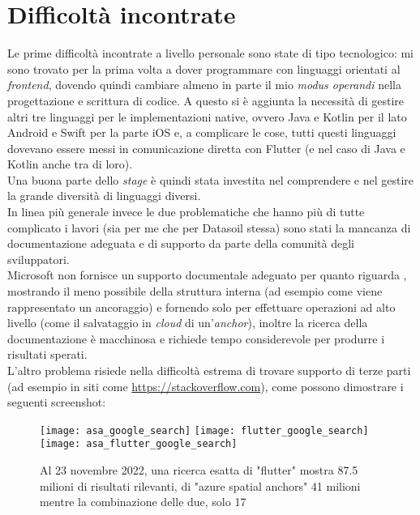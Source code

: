 \section{Difficoltà incontrate}
\label{sec:difficolta_incontrate}
Le prime difficoltà incontrate a livello personale sono state di tipo tecnologico: mi sono trovato per la prima volta a dover programmare con linguaggi orientati al \textit{frontend}, dovendo quindi cambiare almeno in parte il mio \textit{modus operandi} nella progettazione e scrittura di codice. A questo si è aggiunta la necessità di gestire altri tre linguaggi per le implementazioni native, ovvero Java e Kotlin per il lato Android e Swift per la parte iOS e, a complicare le cose, tutti questi linguaggi dovevano essere messi in comunicazione diretta con Flutter (e nel caso di Java e Kotlin anche tra di loro).\\ 
Una buona parte dello \textit{stage} è quindi stata investita nel comprendere e nel gestire la grande diversità di linguaggi diversi.\\
In linea più generale invece le due problematiche che hanno più di tutte complicato i lavori (sia per me che per Datasoil stessa) sono stati la mancanza di documentazione adeguata e di supporto da parte della comunità degli sviluppatori.\\
Microsoft non fornisce un supporto documentale adeguato per quanto riguarda \asa{}, mostrando il meno possibile della struttura interna (ad esempio come viene rappresentato un ancoraggio) e fornendo solo \api{} per effettuare operazioni ad alto livello (come il salvataggio in \textit{cloud} di un'\textit{anchor}), inoltre la ricerca della documentazione è macchinosa e richiede tempo considerevole per produrre i risultati sperati.\\
L'altro problema risiede nella difficoltà estrema di trovare supporto di terze parti (ad esempio in siti come \url{https://stackoverflow.com}), come possono dimostrare i seguenti screenshot:

\begin{figure}[H]
  \centering
  \texttt{[image: asa\_google\_search]}\hfill
  \texttt{[image: flutter\_google\_search]}\\
  \texttt{[image: asa\_flutter\_google\_search]}
  \caption[Ricerca esatta Flutter e ASA 23 novembre]{Al 23 novembre 2022, una ricerca esatta di "flutter" mostra 87.5 milioni di risultati rilevanti, di "azure spatial anchors" 41 milioni mentre la combinazione delle due, solo 17}
\end{figure}

